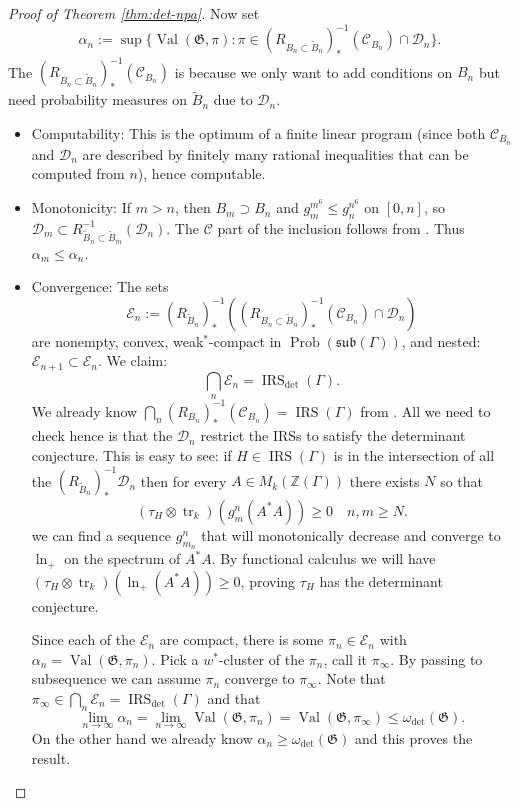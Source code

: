 \documentclass[pdflatex,sn-mathphys-num]{sn-jnl}%
\DeclareMathOperator{\tr}{tr}
\DeclareMathOperator{\Val}{Val}
\newcommand{\IRS}{\operatorname{IRS}}
\begin{document}
\begin{proof}[Proof of Theorem \ref{thm:det-npa}]
    Now set
    \[
        \alpha_n := \sup \{ \Val(\mathfrak{G}, \pi) : \pi \in (R_{B_n\subset \tilde{B}_n})_*^{-1}(\mathcal{C}_{B_n} )\cap \mathcal{D}_n \}.
    \]
    The $(R_{B_n\subset \tilde{B}_n})_*^{-1}(\mathcal{C}_{B_n} )$ is because we only want to add conditions on $B_n$ but need probability measures on $\tilde{B}_n$ due to $\mathcal{D}_n$.
    \begin{itemize}
        \item Computability: This is the optimum of a finite linear program (since both $\mathcal{C}_{B_n}$ and $\mathcal{D}_n$ are described by finitely many rational inequalities that can be computed from $n$), hence computable.
        \item Monotonicity: If $m > n$, then $B_m \supset B_n$ and $g_m^{m^6} \leq g_n^{n^6}$ on $[0,n]$,  
    so $\mathcal{D}_m \subset R_{\tilde{B}_n \subset \tilde{B}_m}^{-1}(\mathcal{D}_n)$. The $\mathcal{C}$ part of the inclusion follows from \cite[Theorem 3.6, monotonicity]{manzoor_there_2025}.
    Thus $\alpha_m \leq \alpha_n$.
    \item Convergence:    The sets
    \[
        \mathcal{E}_n := (R_{\tilde{B}_n})_*^{-1}((R_{B_n\subset \tilde{B}_n})_*^{-1}(\mathcal{C}_{B_n} )\cap \mathcal{D}_n )
    \]
    are nonempty, convex, weak$^*$-compact in $\operatorname{Prob}(\mathfrak{sub}(\Gamma))$, and nested: $\mathcal{E}_{n+1} \subset \mathcal{E}_n$.  
    We claim:
    \[\bigcap_n \mathcal{E}_n = \IRS_{\mathrm{det}}(\Gamma).\]
    We already know $\bigcap_n (R_{B_n})_*^{-1}(\mathcal{C}_{B_n})=\IRS(\Gamma)$ from \cite[Theorem 3.6]{manzoor_there_2025}. All we need to check hence is that the $\mathcal{D}_n$ restrict the IRSs to satisfy the determinant conjecture. This is easy to see: if $H\in \IRS(\Gamma)$ is in the intersection of all the $(R_{\tilde{B}_n})_*^{-1}\mathcal{D}_n$ then for every $A\in M_k(\mathbb{Z}(\Gamma))$ there exists $N$ so that
    \[(\tau_H\otimes \tr_k)(g_m^{n}(A^*A))\geq 0 \quad n,m\geq N.\]
    we can find a sequence $g_{m_n}^{n}$ that will monotonically decrease and converge to $\ln_+$ on the spectrum of $A^*A$. By functional calculus we will have $(\tau_H\otimes \tr_k)(\ln_+(A^*A))\geq 0$, proving $\tau_H$ has the determinant conjecture.

    Since each of the $\mathcal{E}_n$ are compact, there is some $\pi_n\in \mathcal{E}_n$ with $\alpha_n = \Val(\mathfrak{G},\pi_n)$. Pick a $w^*$-cluster of the $\pi_n$, call it $\pi_\infty$. By passing to subsequence we can assume $\pi_n$ converge to $\pi_\infty$. Note that $\pi_\infty \in \bigcap_n\mathcal{E}_n =\IRS_{\mathrm{det}}(\Gamma)$ and that
    \[\lim_{n\to \infty} \alpha_n = \lim_{n\to \infty}\Val(\mathfrak{G},\pi_n) = \Val(\mathfrak{G},\pi_\infty) \leq \omega_{\mathrm{det}}(\mathfrak{G}).\]
    On the other hand we already know $\alpha_n\geq \omega_{\mathrm{det}}(\mathfrak{G})$ and this proves the result.
    \end{itemize}
\end{proof}
\end{document}
